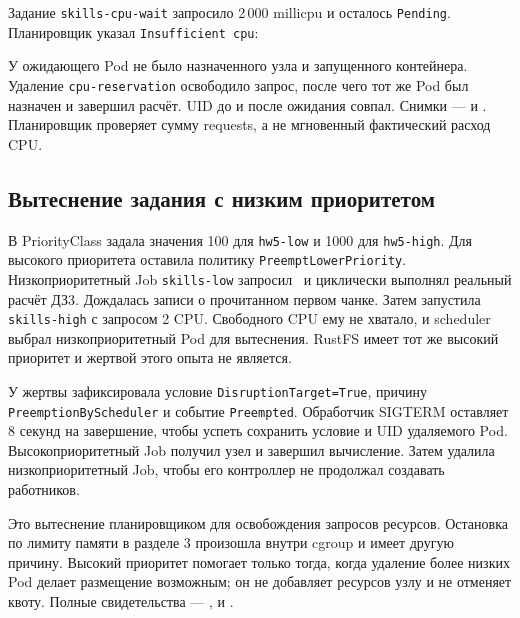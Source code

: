 \documentclass[10pt,a4paper]{article}
\begin{document}
Задание \texttt{skills-cpu-wait} запросило 2\,000 millicpu и осталось
\texttt{Pending}. Планировщик указал \texttt{Insufficient cpu}:

У ожидающего Pod не было назначенного узла и запущенного контейнера.
Удаление \texttt{cpu-reservation} освободило запрос, после чего тот же Pod
был назначен и завершил расчёт. UID до и после ожидания совпал.
Снимки ---  и
. Планировщик проверяет сумму
requests, а не мгновенный фактический расход CPU.

\subsection*{Вытеснение задания с низким приоритетом}
В PriorityClass задала значения 100 для \texttt{hw5-low} и 1000 для
\texttt{hw5-high}. Для высокого приоритета оставила политику
\texttt{PreemptLowerPriority}.
Низкоприоритетный Job \texttt{skills-low} запросил \LowCPU\ и циклически
выполнял реальный расчёт ДЗ3. Дождалась записи о прочитанном первом чанке.
Затем запустила \texttt{skills-high} с запросом 2 CPU.
Свободного CPU ему не хватало, и scheduler выбрал низкоприоритетный Pod
для вытеснения. RustFS имеет тот же высокий приоритет и жертвой этого
опыта не является.


У жертвы зафиксировала условие \texttt{DisruptionTarget=True}, причину
\texttt{PreemptionByScheduler} и событие \texttt{Preempted}.
Обработчик SIGTERM оставляет 8 секунд на завершение, чтобы успеть сохранить
условие и UID удаляемого Pod. Высокоприоритетный Job получил узел и
завершил вычисление. Затем удалила низкоприоритетный Job, чтобы его
контроллер не продолжал создавать работников.

Это вытеснение планировщиком для освобождения запросов ресурсов.
Остановка по лимиту памяти в разделе 3 произошла внутри cgroup и имеет
другую причину. Высокий приоритет помогает только тогда, когда удаление
более низких Pod делает размещение возможным; он не добавляет ресурсов
узлу и не отменяет квоту. Полные свидетельства ---
, 
и .

\clearpage
\end{document}
